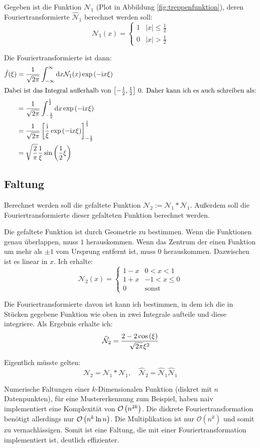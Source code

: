 \documentclass[11pt, ngerman]{article}
\newcommand{\half}{\frac 12}
\newcommand{\ii}{\mathrm i}
\begin{document}
Gegeben ist die Funktion $\mathcal N_1$ (Plot in Abbildung
\ref{fig:treppenfunktion}), deren Fouriertransformierte
$\widehat{\mathcal{N}}_1$ berechnet werden soll:
\[ \mathcal N_1(x) = \begin{cases}
		1 & |x| \leq \frac 12 \\
		0 & |x| > \frac 12
\end{cases} \]

Die Fouriertransformierte ist dann:
\begin{align*}
	\hat f(\xi)
	&= \frac{1}{\sqrt{2\pi}} \int_{-\infty}^\infty \dif x \mathcal N_1(x) \exp\del{-\ii x \xi} \\
	\intertext{Dabei ist das Integral außerhalb von $\intcc{-\frac 12, \frac 12}$ 0. Daher kann ich es auch schreiben als:}
	&= \frac{1}{\sqrt{2\pi}} \int_{-\frac 12}^{\frac 12} \dif x \exp\del{-\ii x \xi} \\
	&= \frac{1}{\sqrt{2\pi}} \sbr{\frac{\ii}{\xi} \exp\del{-\ii x \xi}}_{-\half}^\half \\
	&= \sqrt{\frac 2\pi} \frac 1\xi \sin\del{\frac 12 \xi}
\end{align*}

\subsection{Faltung}

Berechnet werden soll die gefaltete Funktion $\mathcal N_2 := \mathcal N_1 *
\mathcal N_1$. Außerdem soll die Fouriertransformierte dieser gefalteten
Funktion berechnet werden.

Die gefaltete Funktion ist durch Geometrie zu bestimmen. Wenn die Funktionen
genau überlappen, muss $1$ herauskommen. Wenn das Zentrum der einen Funktion um
mehr als $\pm 1$ vom Ursprung entfernt ist, muss $0$ herauskommen. Dazwischen
ist es linear in $x$. Ich erhalte:
\[
	\mathcal N_2(x) = \begin{cases}
		1-x & 0 < x < 1 \\
		1+x & -1 < x \leq 0 \\
		  0 & \text{sonst}
	\end{cases}
\]

Die Fouriertransformierte davon ist kann ich bestimmen, in dem ich die in
Stücken gegebene Funktion wie oben in zwei Integrale aufteile und diese
integriere. Als Ergebnis erhalte ich:
\[
	\widehat{\mathcal N}_2 = \frac{2 - 2 \cos\del\xi}{\sqrt{2\pi} \xi^2}
\]

Eigentlich müsste gelten:
\[
	\mathcal N_2 = \mathcal N_1 * \mathcal N_1
	, \quad
	\widehat{\mathcal N}_2 = \widehat{\mathcal N}_1 \widehat{\mathcal N}_1
\]

Numerische Faltungen einer $k$-Dimensionalen Funktion (diskret mit $n$
Datenpunkten), für eine Mustererkennung zum Beispiel, haben naiv implementiert
eine Komplexität von $\mathcal O\del{n^{2k}}$. Die diskrete
Fouriertransformation benötigt allerdings nur $\mathcal O\del{n^k \ln n}$. Die
Multiplikation ist nur $\mathcal O(n^k)$ und somit zu vernachlässigen. Somit
ist eine Faltung, die mit einer Fouriertransformation implementiert ist,
deutlich effizienter. \cite{mathworld-convolution_theorem}



\end{document}
